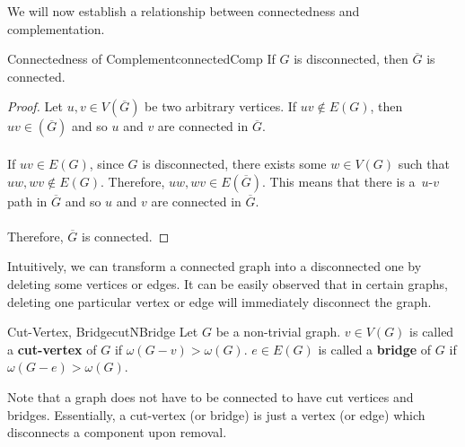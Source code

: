 \documentclass[math, code]{amznotes}
\theoremstyle{remark}
\begin{document}
We will now establish a relationship between connectedness and complementation.
\begin{thmbox}{Connectedness of Complement}{connectedComp}
    If $G$ is disconnected, then $\overline{G}$ is connected.
    \tcblower
    \begin{proof}
        Let $u, v \in V\left(\overline{G}\right)$ be two arbitrary vertices. If $uv \notin E(G)$, then $uv \in \left(\overline{G}\right)$ and so $u$ and $v$ are connected in $\overline{G}$.
        \\\\
        If $uv \in E(G)$, since $G$ is disconnected, there exists some $w \in V(G)$ such that~$uw, wv \notin E(G)$. Therefore, $uw, wv \in E\left(\overline{G}\right)$. This means that there is a~$u$-$v$ path in $\overline{G}$ and so $u$ and $v$ are connected in $\overline{G}$.
        \\\\
        Therefore, $\overline{G}$ is connected.
    \end{proof}
\end{thmbox}
Intuitively, we can transform a connected graph into a disconnected one by deleting some vertices or edges. It can be easily observed that in certain graphs, deleting one particular vertex or edge will immediately disconnect the graph.
\begin{dfnbox}{Cut-Vertex, Bridge}{cutNBridge}
    Let $G$ be a non-trivial graph. $v \in V(G)$ is called a {\color{red} \textbf{cut-vertex}} of $G$ if $\omega(G - v) > \omega(G)$. $e \in E(G)$ is called a {\color{red} \textbf{bridge}} of $G$ if $\omega(G - e) > \omega(G)$.
\end{dfnbox}
Note that a graph does not have to be connected to have cut vertices and bridges. Essentially, a cut-vertex (or bridge) is just a vertex (or edge) which disconnects a component upon removal.
\end{document}
